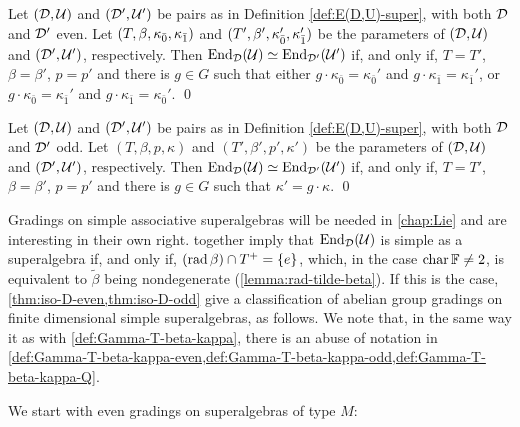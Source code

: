 \begin{thm}\label{thm:iso-D-even}
	Let $(\mathcal{D}, \mathcal U)$ and $(\mathcal{D}', \mathcal U')$ be pairs as in Definition \ref{def:E(D,U)-super}, with both $\mathcal{D}$ and $\mathcal{D}'$ even. 
	Let $(T, \beta, \kappa_{\bar{0}}, \kappa_{\bar{1}})$ and $(T', \beta', \kappa_{\bar{0}}', \kappa_{\bar{1}}')$ be the parameters of $(\mathcal{D}, \mathcal U)$ and $(\mathcal{D}', \mathcal U')$, respectively. 
	Then $\operatorname{End}_{\mathcal{D}} (\mathcal U) \simeq \operatorname{End}_{\mathcal{D}'} (\mathcal U')$ if, and only if, $T=T'$, $\beta=\beta'$, $p = p'$ and there is $g\in G$ such that either $g \cdot \kappa_{\bar 0}=\kappa_{\bar 0}'$ and $g \cdot \kappa_{\bar 1}=\kappa_{\bar 1}'$, or $g \cdot \kappa_{\bar 0}=\kappa_{\bar 1}'$ and $g \cdot \kappa_{\bar 1}=\kappa_{\bar 0}'$. \qed
\end{thm}

\begin{thm}\label{thm:iso-D-odd}
    Let $(\mathcal{D}, \mathcal U)$ and $(\mathcal{D}', \mathcal U')$ be pairs as in Definition \ref{def:E(D,U)-super}, with both $\mathcal{D}$ and $\mathcal{D}'$ odd. 
    Let $(T, \beta, p, \kappa)$ and $(T', \beta', p', \kappa')$ be the parameters of $(\mathcal{D}, \mathcal U)$ and $(\mathcal{D}', \mathcal U')$, respectively. 
	Then $\operatorname{End}_{\mathcal{D}} (\mathcal U) \simeq \operatorname{End}_{\mathcal{D}'} (\mathcal U')$ if, and only if, $T=T'$, $\beta=\beta'$, $p = p'$ and there is $g\in G$ such that $\kappa' = g \cdot \kappa$. \qed
\end{thm}

Gradings on simple associative superalgebras will be needed in \cref{chap:Lie} and are interesting in their own right. 
 together imply that $\operatorname{End}_{\mathcal{D}} (\mathcal U)$ is simple as a superalgebra if, and only if, $(\operatorname{rad} \beta) \cap T^+ = \{e\}$, which, in the case $\operatorname{char} \mathbb{F} \neq 2$, is equivalent to $\tilde\beta$ being nondegenerate (\cref{lemma:rad-tilde-beta}). 
If this is the case,  \cref{thm:iso-D-even,thm:iso-D-odd} give a classification of abelian group gradings on finite dimensional simple superalgebras, as follows. 
We note that, in the same way it as with  \cref{def:Gamma-T-beta-kappa}, there is an abuse of notation in \cref{def:Gamma-T-beta-kappa-even,def:Gamma-T-beta-kappa-odd,def:Gamma-T-beta-kappa-Q}. 



We start with even gradings on superalgebras of type $M$:

